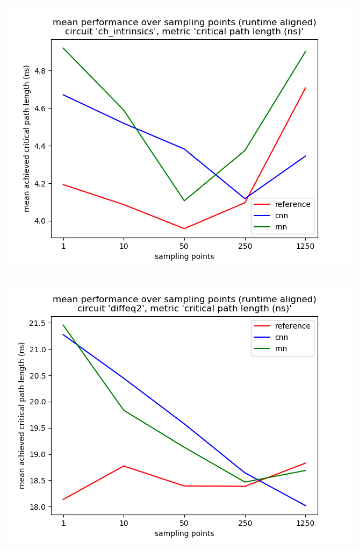 \begin{figure}[H]
	\centering
	\begin{subfigure}[b]{0.49\linewidth}
		\includegraphics[width=\linewidth]{plots/eval-ch_intrinsics-critical-path-mean-full.png}
	\end{subfigure}
	\begin{subfigure}[b]{0.49\linewidth}
		\includegraphics[width=\linewidth]{plots/eval-diffeq2-critical-path-mean-full.png}
	\end{subfigure}
	\begin{subfigure}[b]{0.49\linewidth}

\end{subfigure}
\end{figure}
